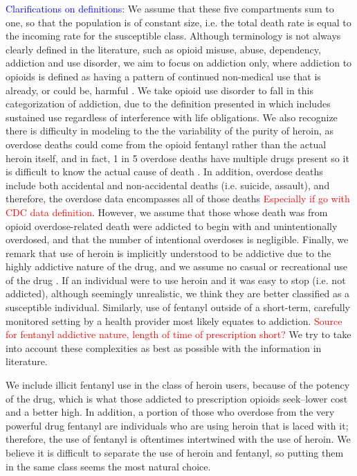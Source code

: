 \documentclass[12pt]{article}
\begin{document}
\textcolor{blue}{Clarifications on definitions:}
We assume that these five compartments sum to one, so that the population is of constant size, i.e. the total death rate is equal to the incoming rate for the susceptible class. Although terminology is not always clearly defined in the literature, such as opioid misuse, abuse, dependency, addiction and use disorder, we aim to focus on addiction only, where addiction to opioids is defined as having a pattern of continued non-medical use that is already, or could be, harmful \cite{Vowles}. We take opioid use disorder to fall in this categorization of addiction, due to the definition presented in \cite{SAMSHA2} which includes sustained use regardless of interference with life obligations. We also recognize there is difficulty in modeling to the the variability of the purity of heroin, as overdose deaths could come from the opioid fentanyl rather than the actual heroin itself, and in fact, 1 in 5 overdose deaths have multiple drugs present so it is difficult to know the actual cause of death \cite{CDC4}. In addition, overdose deaths include both accidental and non-accidental deaths (i.e. suicide, assault), and therefore, the overdose data encompasses all of those deaths \textcolor{red}{Especially if go with CDC data definition}.
However, we assume that those whose death was from opioid overdose-related death were addicted to begin with and unintentionally overdosed, and that the number of intentional overdoses is negligible. Finally, we remark that use of heroin is implicitly understood to be addictive due to the highly addictive nature of the drug, and we assume no casual or recreational use of the drug \cite{NIH1}. If an individual were to use heroin and it was easy to stop (i.e. not addicted), although seemingly unrealistic, we think they are better classified as a susceptible individual. Similarly, use of fentanyl outside of a short-term, carefully monitored setting by a health provider most likely equates to addiction. \textcolor{red}{Source for fentanyl addictive nature, length of time of prescription short?} We try to take into account these complexities as best as possible with the information in literature.

We include illicit fentanyl use in the class of heroin users, because of the potency of the drug, which is what those addicted to prescription opioids seek--lower cost and a better high. In addition, a portion of those who overdose from the very powerful drug fentanyl are individuals who are using heroin that is laced with it; therefore, the use of fentanyl is oftentimes intertwined with the use of heroin. We believe it is difficult to separate the use of heroin and fentanyl, so putting them in the same class seems the most natural choice.
\end{document}
